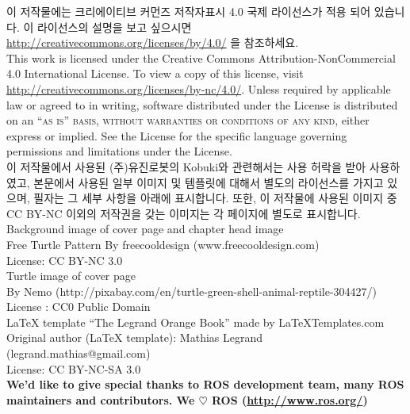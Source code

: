 \documentclass[11pt,fleqn]{book} %
\begin{document}
\noindent 이 저작물에는 크리에이티브 커먼즈 저작자표시 4.0 국제 라이선스가 적용 되어 있습니다. 이 라이선스의 설명을 보고 싶으시면 \url{http://creativecommons.org/licenses/by/4.0/} 을 참조하세요.\\

\noindent This work is licensed under the Creative Commons Attribution-NonCommercial 4.0 International License. To view a copy of this license, visit \url{http://creativecommons.org/licenses/by-nc/4.0/}. Unless required by applicable law or agreed to in writing, software distributed under the License is distributed on an \textsc{``as is'' basis, without warranties or conditions of any kind}, either express or implied. See the License for the specific language governing permissions and limitations under the License.\\ %

\noindent 이 저작물에서 사용된 (주)유진로봇의 Kobuki와 관련해서는 사용 허락을 받아 사용하였고, 본문에서 사용된 일부 이미지 및 템플릿에 대해서 별도의 라이선스를 가지고 있으며, 필자는 그 세부 사항을 아래에 표시합니다. 또한, 이 저작물에 사용된 이미지 중 CC BY-NC 이외의 저작권을 갖는 이미지는 각 페이지에 별도로 표시합니다.\\

\noindent Background image of cover page and chapter head image\\
Free Turtle Pattern By freecooldesign (www.freecooldesign.com)\\
License: CC BY-NC 3.0\\

\noindent Turtle image of cover page\\
By Nemo (http://pixabay.com/en/turtle-green-shell-animal-reptile-304427/)\\
License : CC0 Public Domain\\

\noindent LaTeX template ``The Legrand Orange Book'' made by LaTeXTemplates.com\\
Original author (LaTeX template): Mathias Legrand (legrand.mathias@gmail.com)\\
License: CC BY-NC-SA 3.0\\

\noindent \textbf{We'd like to give special thanks to ROS development team, many ROS maintainers and contributors. We $\heartsuit$ ROS (\url{http://www.ros.org/})}

\end{document}
